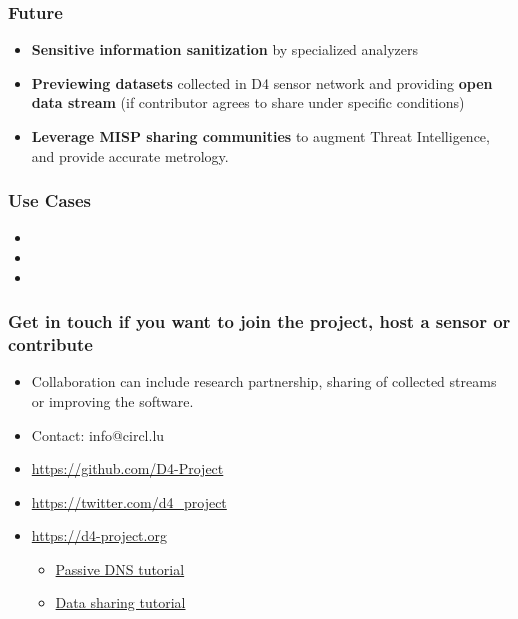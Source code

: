 \documentclass{beamer}
\begin{document}
\begin{frame}
  \frametitle{Future}
     \begin{itemize}
     \item {\bf Sensitive information sanitization} by specialized analyzers 
     \item {\bf Previewing datasets} collected in D4 sensor network and providing {\bf open data stream} (if contributor agrees to share under specific conditions)
     \item {\bf Leverage MISP sharing communities} to augment Threat
       Intelligence, and provide accurate metrology. 
\end{itemize}
\end{frame}

\begin{frame}
\frametitle{Use Cases}
\begin{itemize}
\item 
\item 
\item 
\end{itemize}
\end{frame}

\begin{frame}
\frametitle{Get in touch if you want to join the project, host a sensor or contribute}
\begin{itemize}
\item Collaboration can include research partnership, sharing of collected streams or improving the software.
\item Contact: info@circl.lu
\item \url{https://github.com/D4-Project}
\item \url{https://twitter.com/d4_project}
\item \url{https://d4-project.org}
\begin{itemize}
  \item
    \href{https://d4-project.org/2019/05/28/passive-dns-tutorial.html}{Passive DNS tutorial}
  \item
    \href{https://d4-project.org/2019/06/17/sharing-between-D4-sensors.html}{Data
      sharing tutorial}
\end{itemize}
\end{itemize}
\end{frame}
\end{document}
